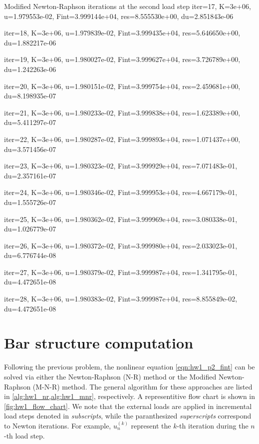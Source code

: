 \begin{codenv}{Modified Newton-Raphson iterations at the second load step}
iter=17, K=3e+06, u=1.979553e-02, Fint=3.999144e+04, res=8.555530e+00, du=2.851843e-06

iter=18, K=3e+06, u=1.979839e-02, Fint=3.999435e+04, res=5.646650e+00, du=1.882217e-06

iter=19, K=3e+06, u=1.980027e-02, Fint=3.999627e+04, res=3.726789e+00, du=1.242263e-06

iter=20, K=3e+06, u=1.980151e-02, Fint=3.999754e+04, res=2.459681e+00, du=8.198935e-07

iter=21, K=3e+06, u=1.980233e-02, Fint=3.999838e+04, res=1.623389e+00, du=5.411297e-07

iter=22, K=3e+06, u=1.980287e-02, Fint=3.999893e+04, res=1.071437e+00, du=3.571456e-07

iter=23, K=3e+06, u=1.980323e-02, Fint=3.999929e+04, res=7.071483e-01, du=2.357161e-07

iter=24, K=3e+06, u=1.980346e-02, Fint=3.999953e+04, res=4.667179e-01, du=1.555726e-07

iter=25, K=3e+06, u=1.980362e-02, Fint=3.999969e+04, res=3.080338e-01, du=1.026779e-07

iter=26, K=3e+06, u=1.980372e-02, Fint=3.999980e+04, res=2.033023e-01, du=6.776744e-08

iter=27, K=3e+06, u=1.980379e-02, Fint=3.999987e+04, res=1.341795e-01, du=4.472651e-08

iter=28, K=3e+06, u=1.980383e-02, Fint=3.999987e+04, res=8.855849e-02, du=4.472651e-08

\end{codenv}

\section{Bar structure computation}
Following the previous problem, the nonlinear equation \cref{eqn:hw1_p2_fint} can be solved via either the Newton-Raphson (N-R) method or the Modified Newton-Raphson (M-N-R) method. 
The general algorithm for these approaches are listed in \cref{alg:hw1_nr,alg:hw1_mnr}, respectively. 
A representitive flow chart is shown in \cref{fig:hw1_flow_chart}.
We note that the external loads are applied in incremental load steps denoted in \emph{subscripts}, while the paranthesized \emph{superscripts} correspond to Newton iterations.
For example, $u_n^{(k)}$ represent the $k$-th iteration during the $n$-th load step. 

